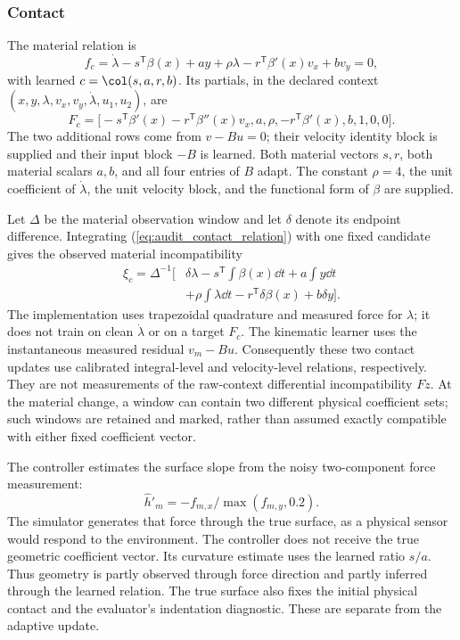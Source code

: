 \subsubsection{Contact}
The material relation is
\begin{equation}
 f_c=\dot\lambda-s^{\mathsf T}\beta(x)+ay+\rho\lambda
       -r^{\mathsf T}\beta'(x)v_x+bv_y=0,
 \label{eq:audit_contact_relation}
\end{equation}
with learned $c=\col(s,a,r,b)$. Its partials, in the declared context
$(x,y,\lambda,v_x,v_y,\dot\lambda,u_1,u_2)$, are
\begin{equation}
 F_c=\bigl[-s^{\mathsf T}\beta'(x)-r^{\mathsf T}\beta''(x)v_x,
 a,\rho,-r^{\mathsf T}\beta'(x),b,1,0,0\bigr].
 \label{eq:audit_contact_partials}
\end{equation}
The two additional rows come from $v-Bu=0$; their velocity identity block
is supplied and their input block $-B$ is learned. Both material vectors
$s,r$, both material scalars $a,b$, and all four entries of $B$ adapt.
The constant $\rho=4$, the unit coefficient of $\dot\lambda$, the unit
velocity block, and the functional form of $\beta$ are supplied.

Let $\Delta$ be the material observation window and let $\delta$ denote
its endpoint difference. Integrating (\ref{eq:audit_contact_relation})
with one fixed candidate gives the observed material incompatibility
\begin{equation}
 \begin{split}
 \xi_c=\Delta^{-1}\biggl[&\delta\lambda-s^{\mathsf T}\!\int\beta(x)\dd t
 +a\!\int y\dd t\\
 &+\rho\!\int\lambda\dd t-r^{\mathsf T}\delta\beta(x)+b\delta y\biggr].
 \end{split}
 \label{eq:audit_contact_integral}
\end{equation}
The implementation uses trapezoidal quadrature and measured force for
$\lambda$; it does not train on clean $\dot\lambda$ or on a target $F_c$.
The kinematic learner uses the instantaneous measured residual $v_m-Bu$.
Consequently these two contact updates use calibrated integral-level and
velocity-level relations, respectively. They are not measurements of the
raw-context differential incompatibility $F\dot z$. At the material
change, a window can contain two different physical coefficient sets;
such windows are retained and marked, rather than assumed exactly
compatible with either fixed coefficient vector.

The controller estimates the surface slope from the noisy two-component
force measurement:
\begin{equation*}
 \widehat h'_m=-f_{m,x}/\max(f_{m,y},0.2).
\end{equation*}
The simulator generates
that force through the true surface, as a physical sensor would respond to
the environment. The controller does not receive the true geometric
coefficient vector. Its curvature estimate uses the learned ratio $s/a$.
Thus geometry is partly observed through force direction and partly
inferred through the learned relation. The true surface also fixes the
initial physical contact and the evaluator's indentation diagnostic.
These are separate from the adaptive update.

